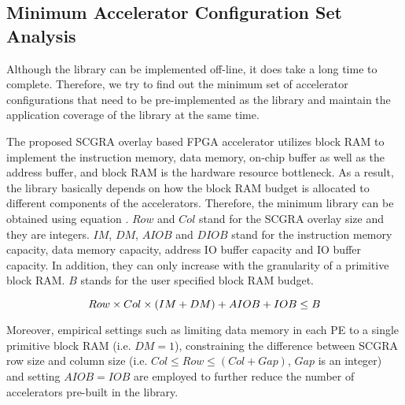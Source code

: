 \subsection{Minimum Accelerator Configuration Set Analysis}
Although the library can be implemented off-line, it does take a long time to complete.
Therefore, we try to find out the minimum set of accelerator configurations that need to be
pre-implemented as the library and maintain the application coverage of the library at the same
time. 

The proposed SCGRA overlay based FPGA accelerator utilizes
block RAM to implement the instruction memory, data memory, on-chip buffer as well as the address
buffer, and block RAM is the hardware resource bottleneck. As a result, the library basically depends on how
the block RAM budget is allocated to different components of the accelerators. Therefore, the
minimum library can be obtained using equation . $Row$ and $Col$ stand for the SCGRA
overlay size and they are integers. $IM$, $DM$, $AIOB$ and $DIOB$ stand for the instruction memory capacity,
data memory capacity, address IO buffer capacity and IO buffer capacity. In addition, they can only increase with the granularity of a primitive block RAM. $B$ stands for the user specified block RAM budget. 

\begin{equation} \label{eq:lib-gen}
    \footnotesize
    Row \times Col \times(IM + DM) + AIOB + IOB \leq B
\end{equation}

Moreover, empirical settings such as limiting data memory in each PE to a single primitive block RAM
(i.e. $DM = 1$), constraining the difference between SCGRA row size and column size (i.e. $Col \leq
Row \leq (Col + Gap)$, $Gap$ is an integer) and setting $AIOB = IOB$ are employed to further reduce the number of
accelerators pre-built in the library.  

